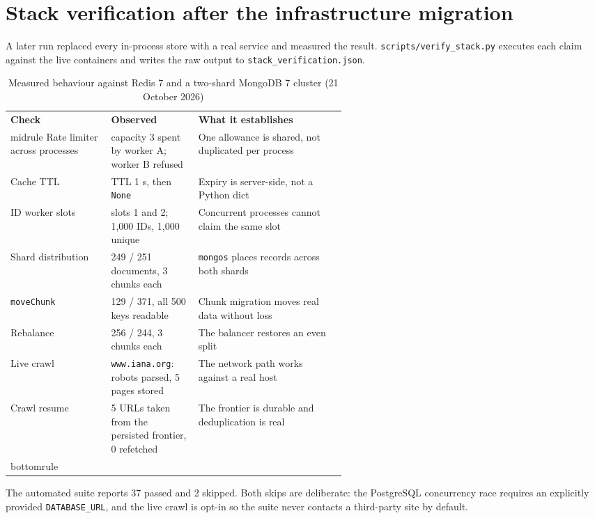 \documentclass[11pt,a4paper,oneside]{report}
\begin{document}
\section{Stack verification after the infrastructure migration}
A later run replaced every in-process store with a real service and measured the result. \texttt{scripts/verify\_stack.py} executes each claim against the live containers and writes the raw output to \texttt{stack\_verification.json}.
\begin{table}[htbp]
\centering\small
\caption{Measured behaviour against Redis 7 and a two-shard MongoDB 7 cluster (21 October 2026)}\label{tab:stackverify}
\begin{tabularx}{\linewidth}{@{}p{0.3\linewidth}p{0.26\linewidth}X@{}}\toprule
\textbf{Check} & \textbf{Observed} & \textbf{What it establishes} \\midrule
Rate limiter across processes & capacity 3 spent by worker A; worker B refused & One allowance is shared, not duplicated per process \\
Cache TTL & TTL 1 s, then \texttt{None} & Expiry is server-side, not a Python dict \\
ID worker slots & slots 1 and 2; 1,000 IDs, 1,000 unique & Concurrent processes cannot claim the same slot \\
Shard distribution & 249 / 251 documents, 3 chunks each & \texttt{mongos} places records across both shards \\
\texttt{moveChunk} & 129 / 371, all 500 keys readable & Chunk migration moves real data without loss \\
Rebalance & 256 / 244, 3 chunks each & The balancer restores an even split \\
Live crawl & \texttt{www.iana.org}: robots parsed, 5 pages stored & The network path works against a real host \\
Crawl resume & 5 URLs taken from the persisted frontier, 0 refetched & The frontier is durable and deduplication is real \\bottomrule
\end{tabularx}
\end{table}

The automated suite reports 37 passed and 2 skipped. Both skips are deliberate: the PostgreSQL concurrency race requires an explicitly provided \texttt{DATABASE\_URL}, and the live crawl is opt-in so the suite never contacts a third-party site by default.
\end{document}
